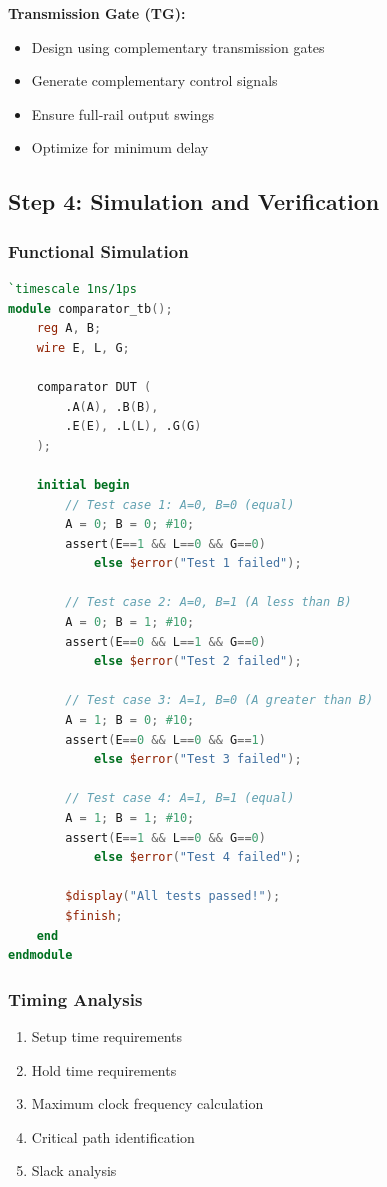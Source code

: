 \documentclass[12pt,a4paper,twoside]{report}
\begin{document}
\begin{appendices}
\textbf{Transmission Gate (TG):}
\begin{itemize}
    \item Design using complementary transmission gates
    \item Generate complementary control signals
    \item Ensure full-rail output swings
    \item Optimize for minimum delay
\end{itemize}

\subsection{Step 4: Simulation and Verification}

\subsubsection{Functional Simulation}

\begin{lstlisting}[language=Verilog,caption=Functional Test Bench]
`timescale 1ns/1ps
module comparator_tb();
    reg A, B;
    wire E, L, G;
    
    comparator DUT (
        .A(A), .B(B),
        .E(E), .L(L), .G(G)
    );
    
    initial begin
        // Test case 1: A=0, B=0 (equal)
        A = 0; B = 0; #10;
        assert(E==1 && L==0 && G==0)
            else $error("Test 1 failed");
        
        // Test case 2: A=0, B=1 (A less than B)
        A = 0; B = 1; #10;
        assert(E==0 && L==1 && G==0)
            else $error("Test 2 failed");
        
        // Test case 3: A=1, B=0 (A greater than B)
        A = 1; B = 0; #10;
        assert(E==0 && L==0 && G==1)
            else $error("Test 3 failed");
        
        // Test case 4: A=1, B=1 (equal)
        A = 1; B = 1; #10;
        assert(E==1 && L==0 && G==0)
            else $error("Test 4 failed");
        
        $display("All tests passed!");
        $finish;
    end
endmodule
\end{lstlisting}

\subsubsection{Timing Analysis}

\begin{enumerate}
    \item Setup time requirements
    \item Hold time requirements
    \item Maximum clock frequency calculation
    \item Critical path identification
    \item Slack analysis
\end{enumerate}


\end{appendices}
\end{document}
